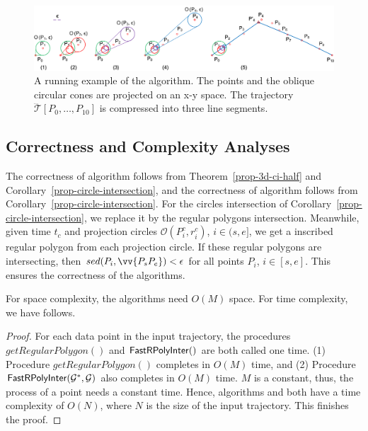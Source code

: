 \begin{figure}[tb!]
\centering
\includegraphics[scale=0.8]{figures/Fig-conesta.png}
\vspace{-1ex}
\caption{\small A running example of the \cista algorithm. The points and the oblique circular cones are projected on an x-y space. The trajectory $\dddot{\mathcal{T}}[P_0, \ldots, P_{10}]$ is compressed into three line segments.}
\vspace{-2ex}
\label{fig:exm-consta}
\end{figure}



\subsection{Correctness and Complexity Analyses}

The correctness of algorithm \cist follows from Theorem~\ref{prop-3d-ci-half} and Corollary~\ref{prop-circle-intersection}, and the correctness of algorithm \cista follows from Corollary~\ref{prop-circle-intersection}. For the circles intersection of Corollary~\ref{prop-circle-intersection}, we replace it by the regular polygons intersection.
Meanwhile, given time $t_c$ and projection circles $\mathcal{O}(P^c_i, r^c_i)$, $i \in (s, e]$, we get a inscribed regular polygon from each projection circle.
If these regular polygons are intersecting, then $sed(P_i, \vv{P_sP_e})<\epsilon$ for all points $P_i$, $i \in [s,e]$.
This ensures the correctness of the algorithms.

{For space complexity, the algorithms need $O(M)$ space.}
For time complexity, we have follows.


\begin{proof}
For each data point in the input trajectory, the procedures $getRegularPolygon()$ and ${\mathsf{FastRPolyInter}}()$ are both called one time.
(1) Procedure $getRegularPolygon()$ completes in $O(M)$ time, and
(2) Procedure ${\mathsf{FastRPolyInter}}(\mathcal{G}^*, \mathcal{G})$ also completes in $O(M)$ time.
$M$ is a constant, thus, the process of a point needs a constant time.
Hence, algorithms \cist and \cista both have a time complexity of $O(N)$, where $N$ is the size of the input trajectory.
This finishes the proof.
\end{proof}



